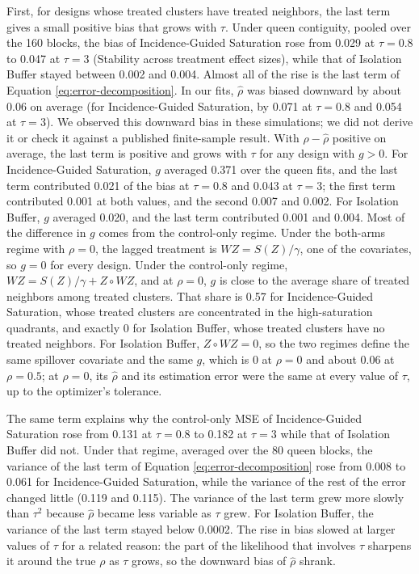 \documentclass[11pt]{article}
\begin{document}
First, for designs whose treated clusters have treated neighbors, the
last term gives a small positive bias that grows with \(\tau\). Under
queen contiguity, pooled over the 160 blocks, the bias of
Incidence-Guided Saturation rose from 0.029 at \(\tau = 0.8\)
to 0.047 at \(\tau = 3\) (Stability across treatment effect sizes),
while that of Isolation Buffer stayed between 0.002 and 0.004. Almost
all of the rise is the last term of Equation
\ref{eq:error-decomposition}. In our fits, \(\hat\rho\) was biased
downward by about 0.06 on average (for Incidence-Guided Saturation, by 0.071 at \(\tau = 0.8\) and 0.054 at \(\tau = 3\)). We
observed this downward bias in these simulations; we did not derive it
or check it against a published finite-sample result. With
\(\rho - \hat\rho\) positive on average, the last term is positive and
grows with \(\tau\) for any design with \(g > 0\). For Incidence-Guided
Saturation, \(g\) averaged 0.371 over the queen fits, and the
last term contributed 0.021 of the bias at \(\tau = 0.8\) and 0.043 at
\(\tau = 3\); the first term contributed 0.001 at both values, and the
second 0.007 and 0.002. For Isolation Buffer, \(g\) averaged 0.020, and
the last term contributed 0.001 and 0.004. Most of the difference in
\(g\) comes from the control-only regime. Under the both-arms regime
with \(\rho = 0\), the lagged treatment is \(WZ = S(Z)/\gamma\), one of
the covariates, so \(g = 0\) for every design. Under the control-only
regime, \(WZ = S(Z)/\gamma + Z \circ WZ\), and at \(\rho = 0\), \(g\) is
close to the average share of treated neighbors among treated clusters.
That share is 0.57 for Incidence-Guided Saturation, whose
treated clusters are concentrated in the high-saturation quadrants, and
exactly 0 for Isolation Buffer, whose treated clusters have no treated
neighbors. For Isolation Buffer, \(Z \circ WZ = 0\), so the two regimes
define the same spillover covariate and the same \(g\), which is 0 at
\(\rho = 0\) and about 0.06 at \(\rho = 0.5\); at \(\rho = 0\), its
\(\hat\rho\) and its estimation error were the same at every value of
\(\tau\), up to the optimizer's tolerance.

The same term explains why the control-only MSE of Incidence-Guided
Saturation rose from 0.131 at \(\tau = 0.8\) to 0.182 at
\(\tau = 3\) while that of Isolation Buffer did not. Under that regime,
averaged over the 80 queen blocks, the variance of the last term of
Equation \ref{eq:error-decomposition} rose from 0.008 to 0.061 for
Incidence-Guided Saturation, while the variance of the rest of
the error changed little (0.119 and 0.115). The variance of the last
term grew more slowly than \(\tau^2\) because \(\hat\rho\) became less
variable as \(\tau\) grew. For Isolation Buffer, the variance of the
last term stayed below 0.0002. The rise in bias slowed at larger values
of \(\tau\) for a related reason: the part of the likelihood that
involves \(\tau\) sharpens it around the true \(\rho\) as \(\tau\)
grows, so the downward bias of \(\hat\rho\) shrank.
\end{document}
